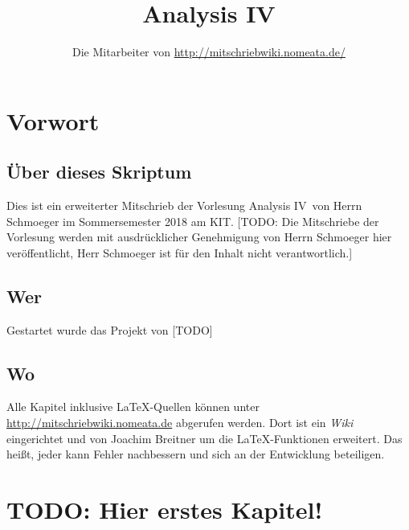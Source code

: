 \documentclass[a4paper,twoside,DIV15,BCOR12mm]{scrbook}
\author{Die Mitarbeiter von \url{http://mitschriebwiki.nomeata.de/}}
\title{Analysis IV}
\begin{document}
\maketitle
 
\renewcommand{\thechapter}{\Roman{chapter}}
\tableofcontents

\chapter{Vorwort}

\section{Über dieses Skriptum}
Dies ist ein erweiterter Mitschrieb der Vorlesung \glqq Analysis IV\grqq\ von Herrn Schmoeger im
Sommersemester 2018 am KIT. [TODO: Die Mitschriebe der Vorlesung werden mit
ausdrücklicher Genehmigung von Herrn Schmoeger hier veröffentlicht, Herr Schmoeger ist für den
Inhalt nicht verantwortlich.]

\section{Wer}
Gestartet wurde das Projekt von [TODO]

\section{Wo}
Alle Kapitel inklusive \LaTeX-Quellen können unter \url{http://mitschriebwiki.nomeata.de} abgerufen werden.
Dort ist ein \emph{Wiki} eingerichtet und von Joachim Breitner um die \LaTeX-Funktionen erweitert.
Das heißt, jeder kann Fehler nachbessern und sich an der Entwicklung
beteiligen.

\chapter{TODO: Hier erstes Kapitel!}
\end{document}
